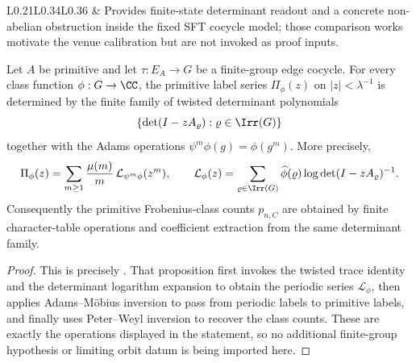 \begin{table}[t]
\begin{tabular}{L{0.21\textwidth}L{0.34\textwidth}L{0.36\textwidth}}
        \cite{Coles2025VassilievWritheAxiomA,Humbert2025FirstRuelleResonance,OHare2025FiniteDataRigidity,CrismaleDelVecchioGrisetaRossi2025NoncommutativeSkewProduct}
      & Provides finite-state determinant readout and a concrete non-abelian
        obstruction inside the fixed SFT cocycle model; those comparison works
        motivate the venue calibration but are not invoked as proof inputs. \\
    \bottomrule
  \end{tabular}
  \caption{Theorem-by-theorem calibration of the paper's contribution.  The
  table separates inherited symbolic-dynamical inputs from the finite-label
  Adams--M\"obius and fixed-label product calculations proved here.}
  \label{tab:novelty-calibration}
\end{table}

\begin{theorem}
  \label{stmt:main-theorem-i-adams-mobius-linearisation}
  \label{thm:intro-adams-mobius-linearisation}
  \label{thm:intro-finite-group}
  \label{thm:intro-adams-mobius}
  Let \(A\) be primitive and let \(\tau:E_A\to G\) be a finite-group edge
  cocycle.  For every class function \(\phi:G\to\CC\), the primitive
  label series \(\Pi_\phi(z)\) on \(|z|<\lambda^{-1}\) is determined by
  the finite family of twisted determinant polynomials
  \[
    \{\det(I-zA_\varrho):\varrho\in\Irr(G)\}
  \]
  together with the Adams operations \(\psi^m\phi(g)=\phi(g^m)\).  More
  precisely,
  \[
    \Pi_\phi(z)=
    \sum_{m\ge1}\frac{\mu(m)}{m}\,
      \mathcal L_{\psi^m\phi}(z^m),
    \qquad
    \mathcal L_\phi(z)=
    \sum_{\varrho\in\Irr(G)}\widehat\phi(\varrho)
      \log\det(I-zA_\varrho)^{-1}.
  \]
  Consequently the primitive Frobenius-class counts \(p_{n,C}\) are
  obtained by finite character-table operations and coefficient
  extraction from the same determinant family.
\end{theorem}
\begin{proof}
  This is precisely .  That proposition
  first invokes the twisted trace identity and the determinant logarithm
  expansion to obtain the periodic series \(\mathcal L_\phi\), then applies
  Adams--M\"obius inversion to pass from periodic labels to primitive labels,
  and finally uses Peter--Weyl inversion to recover the class counts.  These
  are exactly the operations displayed in the statement, so no additional
  finite-group hypothesis or limiting orbit datum is being imported here.
\end{proof}

